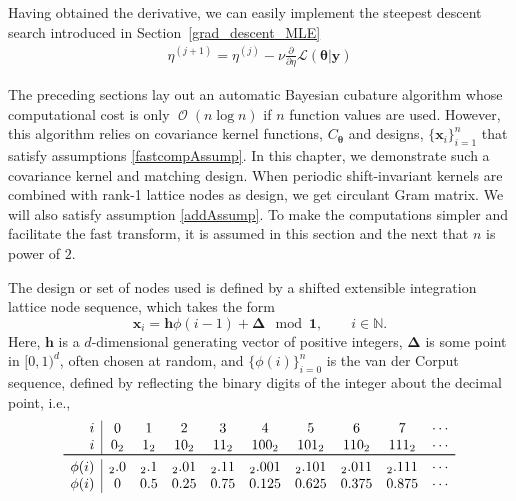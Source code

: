 \documentclass{iitthesis}          %
\DeclareMathOperator{\Order}{{\mathcal O}}
\newcommand{\bm}[1]{\boldsymbol{#1}}
\newcommand{\naturals}{\mathbb{N}}
\newcommand{\vDelta}{{\boldsymbol{\Delta}}}
\newcommand{\vtheta}{{\bm{\theta}}}
\newcommand{\vh}{\bm{h}}
\newcommand{\vx}{\bm{x}}
\newcommand{\vy}{\bm{y}}
\newcommand{\vone}{\bm{1}}
\newcommand\secref{Section~\ref}
\begin{document}
Having obtained the derivative, we can easily implement the steepest descent search introduced in \secref{grad_descent_MLE} 
\begin{align*}
\eta^{(j+1)} = \eta^{(j)} - \nu \frac{\partial}{\partial \eta} \mathcal{L}(\vtheta | \vy)
\end{align*}













\label{sec:shift_invariant_kernel}

The preceding sections lay out an automatic Bayesian cubature algorithm whose computational cost is only $\Order(n \log n)$ if $n$ function values are used.  However, this algorithm relies on covariance kernel functions, $C_{\vtheta}$ and designs, $\{\vx_i\}_{i=1}^n$ that satisfy assumptions \eqref{fastcompAssump}.  
In this chapter, we demonstrate such a covariance kernel and matching design.
When periodic shift-invariant kernels are combined with rank-1 lattice nodes as design, we get circulant Gram matrix. 
We will also satisfy assumption \eqref{addAssump}.  To make the computations simpler and facilitate the fast transform, it is assumed in this section and the next that $n$ is power of $2$.  



The design or set of nodes used is defined by a shifted extensible integration lattice node sequence, which takes the form
\begin{equation}
\label{eqn:lattice_gen}
\vx_{i} = \vh \phi(i-1) + \vDelta \mod \vone, \qquad i \in \naturals.
\end{equation} 
Here, $\vh$ is a $d$-dimensional generating vector of positive integers, $\vDelta$ is some point in $[0,1)^d$, often chosen at random, and $\{\phi(i)\}_{i=0}^n$ is the van der Corput sequence, defined by reflecting the binary digits of the integer about the decimal point, i.e., 
\begin{equation} \label{vdCDef}
\begin{array}{r|ccccccccccccc}
i & 0 & 1 & 2 & 3 & 4 &  5 & 6 & 7 & \cdots \\
i & 0_2 & 1_2 & 10_2 & 11_2 & 100_2 & 101_2 & 110_2 & 111_2  & \cdots\\
\toprule
\phi(i) & {}_2.0 &  {}_2.1 & {}_2.01 &  {}_2.11  & {}_2.001 &  {}_2.101 & {}_2.011 &  {}_2.111 & \cdots\\
\phi(i) & 0 &  0.5 &  0.25 & 0.75 &  0.125 & 0.625  &  0.375 & 0.875 & \cdots
\end{array}
\end{equation}
\end{document}
